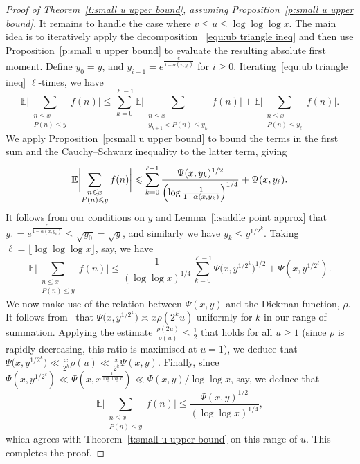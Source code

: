 \documentclass[12pt,a4paper,reqno]{amsart}
\numberwithin{equation}{section}
\def\E{\mathbb E}
\def\leq {\leqslant}
\theoremstyle{remark}
\theoremstyle{definition}
\numberwithin{equation}{section}
\theoremstyle{remark}
\def\E{\mathbb E}
\begin{document}
\begin{proof}[Proof of Theorem~\ref{t:small u upper bound}, assuming Proposition~\ref{p:small u upper bound}]
It remains to handle the case where $v \leq u \leq \log \log \log x$. The main idea is to iteratively apply the decomposition ~\eqref{equ:ub triangle ineq} and then use Proposition~\ref{p:small u upper bound} to evaluate the resulting absolute first moment. Define $y_0 = y$, and $y_{i+1} = e^{\frac{c}{1 - \alpha (x, y_i)}}$ for $i \geq 0$. Iterating~\eqref{equ:ub triangle ineq} $\ell$-times, we have
\[
\E \biggl| \sum_{\substack{n \leq x \\ P(n) \leq y}} f(n) \biggr| \leq \sum_{k=0}^{\ell-1} \E \biggl| \sum_{\substack{n \leq x \\ y_{k+1} < P(n) \leq y_k}} f(n) \biggr| + \E \biggl| \sum_{\substack{n \leq x \\ P(n) \leq y_{\ell}}} f(n) \biggr| .
\]
We apply Proposition~\ref{p:small u upper bound} to bound the terms in the first sum and the Cauchy--Schwarz inequality to the latter term, giving
\[
\E \biggl| \sum_{\substack{n \leq x \\ P(n) \leq y}} f(n) \biggr| \leq \sum_{k=0}^{\ell-1} \frac{\Psi(x,y_k)^{1/2}}{\Bigl(\log \frac{1}{1-\alpha( x,y_k )} \Bigr)^{1/4}} + \Psi(x, y_{\ell}) .
\]
It follows from our conditions on $y$ and Lemma~\ref{l:saddle point approx} that
$y_1 = e^{\frac{c}{1 - \alpha (x,y_0)}} \leq \sqrt{y_0} = \sqrt{y}$, and similarly we have
$y_k \leq y^{1/2^k}$. Taking $\ell = \lfloor \log \log \log x \rfloor$, say, we have
\[
\E \biggl| \sum_{\substack{n \leq x \\ P(n) \leq y}} f(n) \biggr| \leq \frac{1}{(\log \log x)^{1/4}} \sum_{k=0}^{\ell-1} \Psi \bigl( x,y^{1/2^k} \bigr)^{1/2} + \Psi(x, y^{1/2^{\ell}}) .
\]
We now make use of the relation between $\Psi(x,y)$ and the Dickman function, $\rho$. It follows from~\cite[Theorem~III.5.8]{TenenbaumAPNT} that $\Psi \bigl( x,y^{1/2^k} \bigr) \asymp x \rho ( 2^k u )$ uniformly for $k$ in our range of summation. Applying the estimate $\frac{\rho(2u)}{\rho(u)} \leq \frac{1}{2}$ that holds for all $u \geq 1$ (since $\rho$ is rapidly decreasing, this ratio is maximised at $u=1$), we deduce that $\Psi \bigl( x,y^{1/2^k} \bigr) \ll \frac{x}{2^k} \rho(u) \ll \frac{x}{2^k} \Psi(x,y)$. Finally, since $\Psi(x, y^{1/2^{\ell}}) \ll \Psi(x, x^{\frac{1}{\log \log x}}) \ll \Psi(x,y) / \log \log x$, say, we deduce that
\[
\E \biggl| \sum_{\substack{n \leq x \\ P(n) \leq y}} f(n) \biggr| \leq \frac{\Psi(x,y)^{1/2}}{(\log \log x)^{1/4}} ,
\]
which agrees with Theorem~\ref{t:small u upper bound} on this range of $u$. This completes the proof.
\end{proof}
\end{document}
